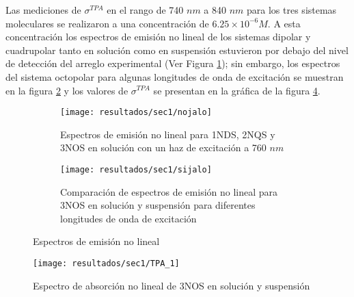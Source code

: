 \begin{table}[H]
\centering
{} 
\caption{ Valores obtenidos de eficiencia cu\'antica de fluorescencia $\Phi$ para el sistema octopolar  \label{tablita}}
\end{table}


Las mediciones de $\sigma^{TPA}$ en el rango de 740 $nm$ a 840 $nm$ para los tres sistemas moleculares se realizaron a una concentraci\'on de $6.25\times 10^{-6} M$. A esta concentraci\'on los espectros de emisi\'on no lineal de los sistemas dipolar y cuadrupolar tanto en soluci\'on como en suspensi\'on estuvieron por debajo del nivel de detecci\'on del arreglo experimental (Ver Figura \ref{nel}); sin embargo, los espectros del sistema octopolar para algunas longitudes de onda de excitaci\'on se muestran en la figura \ref{sip} y los valores de $\sigma^{TPA}$ se presentan en la gr\'afica de la figura \ref{tpaprimeros}.

\begin{figure}
\centering
\begin{subfigure}{\textwidth}
\centering
\texttt{[image: resultados/sec1/nojalo]}
\caption{Espectros de emisi\'on no lineal para 1NDS, 2NQS y 3NOS en soluci\'on con un haz de excitaci\'on a 760 $nm$ }\label{nel}
\end{subfigure}
\begin{subfigure}{\textwidth}
\centering
\texttt{[image: resultados/sec1/sijalo]}
\caption{Comparaci\'on de espectros de emisi\'on no lineal para 3NOS en soluci\'on y suspensi\'on para diferentes longitudes de onda de excitaci\'on }\label{sip}
\end{subfigure}
\caption{Espectros de emisi\'on no lineal}
\label{ghghh}
\end{figure}

\begin{figure}[h]
\centering
\texttt{[image: resultados/sec1/TPA\_1]}
\caption{Espectro de absorci\'on no lineal de 3NOS en soluci\'on y suspensi\'on}\label{tpaprimeros}
\end{figure}

